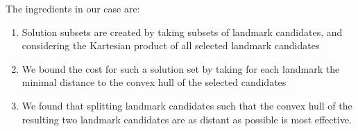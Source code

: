 \documentclass[portrait,final,a0paper,fontscale=0.277]{baposter}
\newcommand*{\normLR}[1]{\left\| #1 \right\|}%
\newcommand*{\SET}[1]  {\ensuremath{\mathcal{#1}}}
\newcommand*{\VEC}[1]  {\ensuremath{\boldsymbol{#1}}}
\DeclareMathOperator*{\argmin}{arg\,min}
\renewcommand{\l}{\VEC l}
\newcommand{\J}{\SET{P}}
\newcommand{\Selection}{\mathbf{S}}
\newcommand{\Params}{\VEC\Theta}
\begin{document}
\begin{poster}
{%

  The ingredients in our case are:
 \begin{enumerate}
 \item Solution subsets are created by taking subsets of landmark
 candidates, and considering the Kartesian product of all selected landmark
 candidates
 \item We bound the cost for such a solution set by taking for each
 landmark the minimal distance to the convex hull of the selected candidates
 \item We found that splitting landmark candidates such that the convex hull of the resulting two landmark candidates are as distant as possible is most effective.
 \end{enumerate}
  }

\end{poster}
\end{document}
